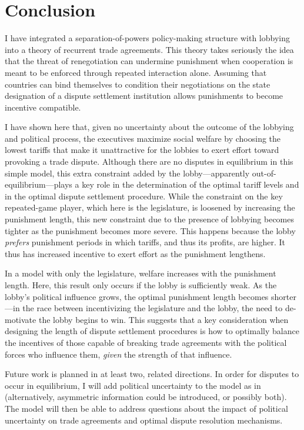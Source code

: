 \documentclass[authoryear, review]{elsarticle}
\begin{document}
\section{Conclusion}
\label{sec:concl3}
I have integrated a separation-of-powers policy-making structure with lobbying into a theory of recurrent trade agreements. This theory takes seriously the idea that the threat of renegotiation can undermine punishment when cooperation is meant to be enforced through repeated interaction alone. Assuming that countries can bind themselves to condition their negotiations on the state designation of a dispute settlement institution allows punishments to become incentive compatible.

I have shown here that, given no uncertainty about the outcome of the lobbying and political process, the executives maximize social welfare by choosing the lowest tariffs that make it unattractive for the lobbies to exert effort toward provoking a trade dispute. Although there are no disputes in equilibrium in this simple model, this extra constraint added by the lobby---apparently out-of-equilibrium---plays a key role in the determination of the optimal tariff levels and in the optimal dispute settlement procedure. While the constraint on the key repeated-game player, which here is the legislature, is loosened by increasing the punishment length, this new constraint due to the presence of lobbying becomes tighter as the punishment becomes more severe. This happens because the lobby \textit{prefers} punishment periods in which tariffs, and thus its profits, are higher. It thus has increased incentive to exert effort as the punishment lengthens.

In a model with only the legislature, welfare increases with the punishment length. Here, this result only occurs if the lobby is sufficiently weak. As the lobby's political influence grows, the optimal punishment length becomes shorter---in the race between incentivizing the legislature and the lobby, the need to de-motivate the lobby begins to win. This suggests that a key consideration when designing the length of dispute settlement procedures is how to optimally balance the incentives of those capable of breaking trade agreements with the political forces who influence them, \textit{given} the strength of that influence.

Future work is planned in at least two, related directions. In order for disputes to occur in equilibrium, I will add political uncertainty to the model as in \citet{buzard2013b} (alternatively, asymmetric information could be introduced, or possibly both). The model will then be able to address questions about the impact of political uncertainty on trade agreements and optimal dispute resolution mechanisms.
\end{document}
